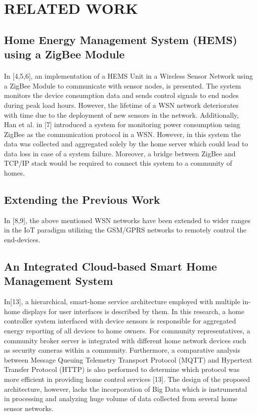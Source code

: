 \documentclass[a4paper,12pt,oneside]{article}
\begin{document}
\newpage
\section{RELATED WORK}
\subsection{Home Energy Management System (HEMS) using a ZigBee Module}
\paragraph{}
In [4,5,6], an
implementation of a HEMS Unit in a Wireless Sensor
Network using a ZigBee Module to communicate with sensor
nodes, is presented. The system monitors the device
consumption data and sends control signals to end nodes
during peak load hours. However, the lifetime of a WSN
network deteriorates with time due to the deployment of new
sensors in the network. Additionally, Han et al. in [7]
introduced a system for monitoring power consumption using
ZigBee as the communication protocol in a WSN. However,
in this system the data was collected and aggregated solely by
the home server which could lead to data loss in case of a
system failure. Moreover, a bridge between ZigBee and
TCP/IP stack would be required to connect this system to a
community of homes.

\subsection{Extending the Previous Work}
In [8,9], the above mentioned WSN networks have been extended
to wider ranges in the IoT paradigm utilizing the GSM/GPRS
networks to remotely control the end-devices.

\subsection{An Integrated Cloud-based Smart Home Management System}
In[13], a hierarchical, smart-home service architecture employed with
multiple in-home displays for user interfaces is described by them.
In this research, a home controller system interfaced
with device sensors is responsible for aggregated energy
reporting of all devices to home owners. For community
representatives, a community broker server is integrated with
different home network devices such as security cameras
within a community. Furthermore, a comparative analysis
between Message Queuing Telemetry Transport Protocol
(MQTT) and Hypertext Transfer Protocol (HTTP) is also
performed to determine which protocol was more efficient in
providing home control services [13]. The design of the
proposed architecture, however, lacks the incorporation of Big
Data which is instrumental in processing and analyzing huge
volume of data collected from several home sensor networks.
\end{document}
